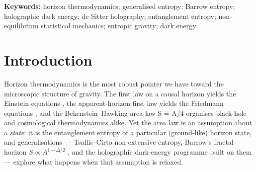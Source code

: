 \documentclass[aps,prd,preprint,nofootinbib,superscriptaddress]{revtex4-2}
\begin{document}
\begin{abstract}
\emph{locked branch} rather than a tunable value. What remains genuinely
conditional is that the two-well landscape presupposes an accessible
volume phase, the mean-field treatment is extrapolated to the N ∼ O(1)
quantum-gravity regime where its tools are not controlled, and the one
concrete model of de Sitter holography (double-scaled SYK) currently
maps to the \emph{area} branch --- so the mechanism relocates and
narrows the postulate, it does not eliminate it. Its lasting value is to
convert an untestable counting postulate into a falsifiable one: a
pre-registered point prediction \(\Delta  = 1\), tested to a forecast
\(\sigma (\Delta ) \approx  0.09\) by DESI DR3 + Euclid. On public data
the model-level statement is modest and is the one we lead with: at
equal parameter count the zero-parameter \(\Delta  = 1\) model is
favoured over \(\Lambda \mathrm{CDM}\) at the cosmology paper's
\(\Delta \mathrm{DIC} \approx  -3\) --- a mild-to-moderate preference,
not a detection. Underneath it, a \emph{profile}-likelihood diagnostic
(the marginalised posterior awaits DR3 + Euclid) shows the
structure-gated family sitting at the volume endpoint,
\(\Delta  = 0.93\) {[}0.83, 1.02{]}, which the un-gated Barrow family
pays \(\Delta \chi ^{2} \approx  2400\) to reach; profile statements of
this kind overstate the marginalised signal by ∼two orders of magnitude
in \(\chi ^{2}\) and are reported as diagnostics, not exclusions. The
cosmological results of the cosmology paper stand independently of the
reduction attempted here.
\end{abstract}

\maketitle

\noindent\textbf{Keywords:} horizon thermodynamics; generalised entropy;
Barrow entropy; holographic dark energy; de Sitter holography;
entanglement entropy; non-equilibrium statistical mechanics; entropic
gravity; dark energy
\vspace{6pt}

\section{Introduction}\label{sec-1}

Horizon thermodynamics is the most robust pointer we have toward the
microscopic structure of gravity. The first law on a causal horizon
yields the Einstein equations \cite{Jacobson:1995ab}, the
apparent-horizon first law yields the Friedmann equations
\cite{Cai:2005ra}, and the Bekenstein--Hawking area law S = A/4
organises black-hole and cosmological thermodynamics alike. Yet the area
law is an assumption about a \emph{state}: it is the entanglement
entropy of a particular (ground-like) horizon state, and generalisations
--- Tsallis--Cirto non-extensive entropy, Barrow's fractal-horizon
\(S \propto  A^{1+\Delta /2}\) \cite{Barrow:2020tzx}, and the
holographic dark-energy programme built on them
\cite{Saridakis:2020zol} --- explore what happens when that assumption
is relaxed.
\end{document}
